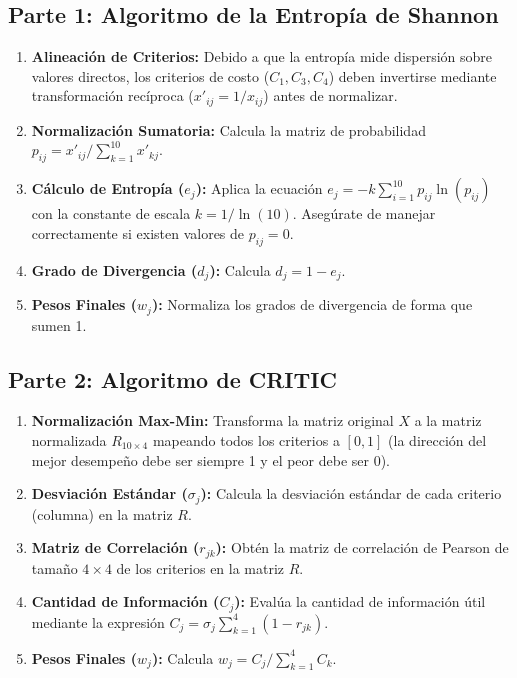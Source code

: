 \documentclass[11pt,a4paper]{article}
\begin{document}
\subsection{Parte 1: Algoritmo de la Entropía de Shannon}
\begin{enumerate}
    \item \textbf{Alineación de Criterios:} Debido a que la entropía mide dispersión sobre valores directos, los criterios de costo ($C_1, C_3, C_4$) deben invertirse mediante transformación recíproca ($x'_{ij} = 1/x_{ij}$) antes de normalizar.
    \item \textbf{Normalización Sumatoria:} Calcula la matriz de probabilidad $p_{ij} = x'_{ij}/\sum_{k=1}^{10} x'_{kj}$.
    \item \textbf{Cálculo de Entropía ($e_j$):} Aplica la ecuación $e_j = -k \sum_{i=1}^{10} p_{ij} \ln(p_{ij})$ con la constante de escala $k = 1/\ln(10)$. Asegúrate de manejar correctamente si existen valores de $p_{ij} = 0$.
    \item \textbf{Grado de Divergencia ($d_j$):} Calcula $d_j = 1 - e_j$.
    \item \textbf{Pesos Finales ($w_j$):} Normaliza los grados de divergencia de forma que sumen 1.
\end{enumerate}

\subsection{Parte 2: Algoritmo de CRITIC}
\begin{enumerate}
    \item \textbf{Normalización Max-Min:} Transforma la matriz original $X$ a la matriz normalizada $R_{10 \times 4}$ mapeando todos los criterios a $[0, 1]$ (la dirección del mejor desempeño debe ser siempre 1 y el peor debe ser 0).
    \item \textbf{Desviación Estándar ($\sigma_j$):} Calcula la desviación estándar de cada criterio (columna) en la matriz $R$.
    \item \textbf{Matriz de Correlación ($r_{jk}$):} Obtén la matriz de correlación de Pearson de tamaño $4 \times 4$ de los criterios en la matriz $R$.
    \item \textbf{Cantidad de Información ($C_j$):} Evalúa la cantidad de información útil mediante la expresión $C_j = \sigma_j \sum_{k=1}^4 (1 - r_{jk})$.
    \item \textbf{Pesos Finales ($w_j$):} Calcula $w_j = C_j / \sum_{k=1}^4 C_k$.
\end{enumerate}
\end{document}
